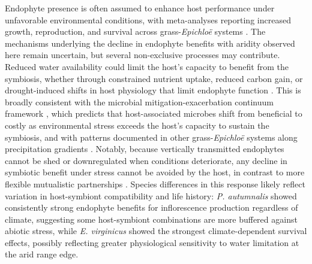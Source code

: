 \documentclass[12pt]{article}\usepackage[]{graphicx}\usepackage[dvipsnames]{xcolor}
\begin{document}
Endophyte presence is often assumed to enhance host performance under unfavorable environmental conditions, with meta-analyses reporting increased growth, reproduction, and survival across grass-\textit{Epichloë} systems \citep{decunta2021systematic}. 
The mechanisms underlying the decline in endophyte benefits with aridity observed here remain uncertain, but several non-exclusive processes may contribute. 
Reduced water availability could limit the host's capacity to benefit from the symbiosis, whether through constrained nutrient uptake, reduced carbon gain, or drought-induced shifts in host physiology that limit endophyte function \citep{ahlholm2002vertically, bronstein2001exploitation, faeth2002endophytic}. 
This is broadly consistent with the microbial mitigation-exacerbation continuum framework \citep{david2018microbial}, which predicts 
that host-associated microbes shift from beneficial to costly as environmental stress exceeds the host's capacity to sustain the symbiosis, and with patterns documented in other grass-\textit{Epichloë} systems along precipitation gradients 
\citep{kannadan2008endophyte}. 
Notably, because vertically transmitted endophytes cannot be shed or downregulated when conditions deteriorate, any decline in symbiotic benefit under stress cannot be avoided by the host, in contrast to more flexible mutualistic 
partnerships \citep{afkhami2009endophyte}. 
Species differences in this response likely reflect variation in host-symbiont compatibility and life history: \textit{P. autumnalis} showed consistently strong endophyte benefits for inflorescence production regardless 
of climate, suggesting some host-symbiont combinations are more buffered against abiotic stress, while \textit{E. virginicus} showed the strongest climate-dependent survival effects, possibly reflecting greater physiological sensitivity to water limitation at the arid range edge.
\end{document}
